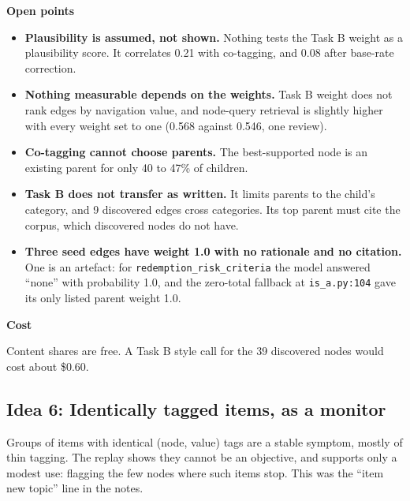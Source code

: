\documentclass[10pt,a4paper]{article}
\newcommand{\code}[1]{\texttt{#1}}
\newcommand{\lab}[1]{\par\vspace{0.35em}\textbf{#1}\par\nobreak}
\begin{document}
\lab{Open points}
\begin{itemize}
\item \textbf{Plausibility is assumed, not shown.} Nothing tests the Task B weight as a plausibility score. It correlates 0.21 with co-tagging, and 0.08 after base-rate correction.
\item \textbf{Nothing measurable depends on the weights.} Task B weight does not rank edges by navigation value, and node-query retrieval is slightly higher with every weight set to one (0.568 against 0.546, one review).
\item \textbf{Co-tagging cannot choose parents.} The best-supported node is an existing parent for only 40 to 47\% of children.
\item \textbf{Task B does not transfer as written.} It limits parents to the child's category, and 9 discovered edges cross categories. Its top parent must cite the corpus, which discovered nodes do not have.
\item \textbf{Three seed edges have weight 1.0 with no rationale and no citation.} One is an artefact: for \code{redemption\_risk\_criteria} the model answered ``none'' with probability 1.0, and the zero-total fallback at \code{is\_a.py:104} gave its only listed parent weight 1.0.
\end{itemize}

\lab{Cost}
Content shares are free. A Task B style call for the 39 discovered nodes would cost about \$0.60.

\subsection{Idea 6: Identically tagged items, as a monitor}

Groups of items with identical (node, value) tags are a stable symptom, mostly of thin tagging. The replay
shows they cannot be an objective, and supports only a modest use: flagging the few nodes where such items
stop. This was the ``item new topic'' line in the notes.
\end{document}
